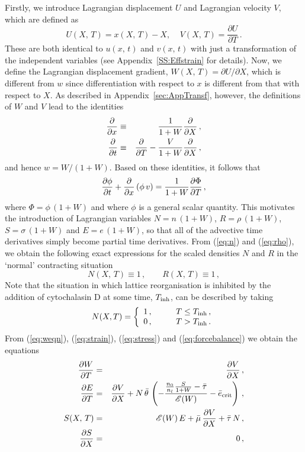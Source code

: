 Firstly, we introduce Lagrangian displacement $U$ and Lagrangian velocity $V$, which are defined as
\[
U(X,\,T) = x(X,\,T) - X,\;\;\;\; V(X,\,T) = \frac{\partial U}{\partial T}\,.
\]
These are both identical to $u(x,\,t)$ and $v(x,\,t)$ with just a transformation of the independent variables (see Appendix~\ref{SS:Effstrain} for details). Now, we define the Lagrangian displacement gradient, $W(X,\,T) = {\partial U}/{\partial X}$, which is different from $w$ since differentiation with respect to $x$ is different from that with respect to $X$. As described in Appendix~\ref{sec:AppTransf}, however, the definitions of $W$ and $V$ lead to the identities
\begin{eqnarray}
\label{eq:LEx}
\frac{\partial }{\partial x}&\equiv&\frac{1}{1+W}\frac{\partial }{\partial X}\,,\\
\label{eq:LEt}
\frac{\partial }{\partial t}&\equiv&\frac{\partial }{\partial T}-\frac{V}{1+W}\frac{\partial }{\partial X}\,,
\end{eqnarray}
and hence $w = W/(1+W)$. Based on these identities, it follows that
\begin{equation}
\label{eq:advectivederiv}
\frac{\partial \phi}{\partial t}+\frac{\partial }{\partial x}\left(\phi\,v\right)=\frac{1}{1+W}\frac{\partial \Phi}{\partial T}\,,
\end{equation}
where $\Phi = \phi \, (1 + W)$ and where $\phi$ is a general scalar quantity. This motivates the introduction of Lagrangian variables $N = n \, (1 + W)$, $R = \rho \, (1 + W)$, $S = \sigma \, (1 + W)$ and $E = e \, (1 + W)$, so that all of the advective time derivatives simply become partial time derivatives. From (\ref{eq:n}) and (\ref{eq:rho}), we obtain the following exact expressions for the scaled densities $N$ and $R$ in the `normal' contracting situation
\[N(X,\,T)\equiv 1\,,\qquad R(X,\,T)\equiv 1\,,\]
Note that the situation in which lattice reorganisation is inhibited by the addition of cytochalasin D at some time, $T_{\rm inh}$, can be described by taking
\begin{equation}
N(X,T)= \left\{
\begin{array}{cc}
1\,,&\qquad T\leq T_{\rm inh}\,,\\
0\,,&\qquad T>T_{\rm inh}\,.
\end{array}\right.
\label{eq:N_inh}
\end{equation}
From (\ref{eq:weqn}), (\ref{eq:strain}), (\ref{eq:stress}) and (\ref{eq:forcebalance}) we obtain the equations
\begin{eqnarray*}
\frac{\partial W}{\partial T}&=& \frac{\partial V}{\partial X}\,,\\
\frac{\partial E}{\partial T}&=& \frac{\partial V}{\partial X} + N\,\bar{\theta}\,\left(-\frac{\frac{n_{0}}{n_{l}}\frac{S}{1+W} - \bar{\tau}}{\mathscr{E}(W)} - \bar{e}_{\rm crit}\right)\,,\\
S(X,\,T) &=& \mathscr{E}(W)\,E + \bar{\mu}\,\frac{\partial V}{\partial X} + \bar{\tau}\,N\,,\\
\frac{\partial S}{\partial X} &=& 0\,,
\label{eq:}
\end{eqnarray*}
